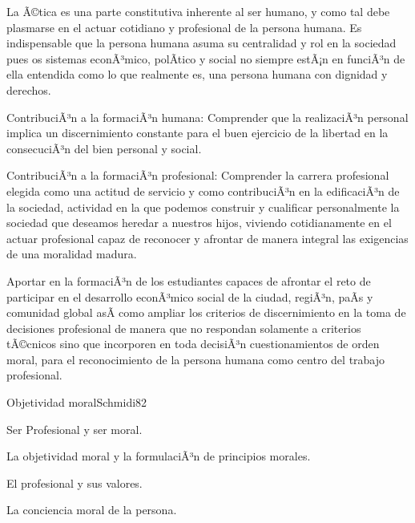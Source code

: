 \begin{syllabus}


\begin{justification}
La Ã©tica es una parte constitutiva inherente al ser humano, y  como tal debe plasmarse en el 
actuar cotidiano y profesional de la persona humana. Es indispensable que la persona humana 
asuma su centralidad y rol en la sociedad pues os sistemas econÃ³mico, polÃ­tico y social no 
siempre estÃ¡n en funciÃ³n de ella entendida como lo que realmente es, una persona humana con 
dignidad y derechos.

ContribuciÃ³n a la formaciÃ³n humana: Comprender que la realizaciÃ³n personal implica  un 
discernimiento constante para el buen ejercicio de la libertad en la consecuciÃ³n del bien 
personal y social.

ContribuciÃ³n a la formaciÃ³n profesional: Comprender la carrera profesional elegida como 
una actitud de servicio y como contribuciÃ³n en la edificaciÃ³n de la sociedad, actividad 
en la que podemos construir  y cualificar personalmente la sociedad que deseamos heredar 
a nuestros hijos, viviendo cotidianamente en el actuar profesional capaz de reconocer y 
afrontar de manera integral las exigencias de una moralidad madura.

\end{justification}

\begin{goals}
\item Aportar en la formaciÃ³n de los estudiantes capaces de afrontar el reto de participar 
en el desarrollo econÃ³mico social de la ciudad, regiÃ³n, paÃ­s y comunidad global asÃ­ 
como ampliar los criterios de discernimiento en la toma de decisiones profesional de 
manera que no respondan solamente a criterios tÃ©cnicos sino que incorporen en toda 
decisiÃ³n cuestionamientos de orden moral, para el reconocimiento de la persona 
humana como centro del trabajo profesional.
\end{goals}

\begin{outcomes}
\end{outcomes}

\begin{unit}{Objetividad moral}{Schmidi}{8}{2}
\begin{topics}
      \item Ser Profesional y ser moral.
      \item La objetividad moral y la formulaciÃ³n de principios morales.
      \item El profesional y sus valores.
      \item La conciencia moral de la persona.
\end{topics}


\end{unit}
\end{syllabus}
